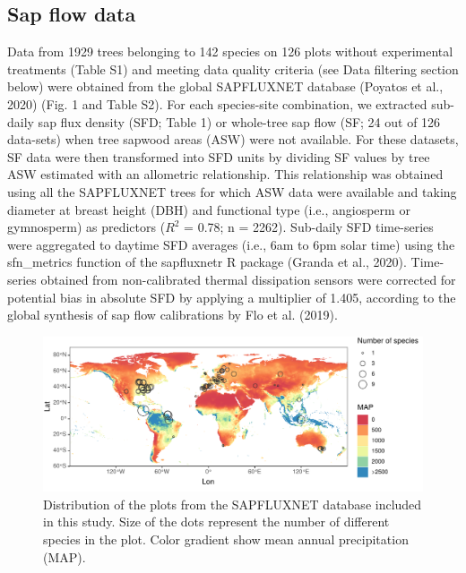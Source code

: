 \documentclass[11pt,twoside]{reedthesis}
\begin{document}
\subsection{Sap flow data}\label{sap-flow-data}

Data from 1929 trees belonging to 142 species on 126 plots without
experimental treatments (Table S1) and meeting data quality criteria
(see Data filtering section below) were obtained from the global
SAPFLUXNET database (Poyatos et al., 2020) (Fig. 1 and Table S2). For
each species-site combination, we extracted sub-daily sap flux density
(SFD; Table 1) or whole-tree sap flow (SF; 24 out of 126 data-sets) when
tree sapwood areas (ASW) were not available. For these datasets, SF data
were then transformed into SFD units by dividing SF values by tree ASW
estimated with an allometric relationship. This relationship was
obtained using all the SAPFLUXNET trees for which ASW data were
available and taking diameter at breast height (DBH) and functional type
(i.e., angiosperm or gymnosperm) as predictors (\(R^2\) = 0.78; n =
2262). Sub-daily SFD time-series were aggregated to daytime SFD averages
(i.e., 6am to 6pm solar time) using the sfn\_metrics function of the
sapfluxnetr R package (Granda et al., 2020). Time-series obtained from
non-calibrated thermal dissipation sensors were corrected for potential
bias in absolute SFD by applying a multiplier of 1.405, according to the
global synthesis of sap flow calibrations by Flo et al. (2019).\par
\begin{figure}[hbt!]

{\centering \includegraphics[width=1\linewidth]{figure/CH5/Figure_1} 

}

\caption[Distribution of the plots from the SAPFLUXNET database included in this study.]{Distribution of the plots from the SAPFLUXNET database included in this study. Size of the dots represent the number of different species in the plot. Color gradient show mean annual precipitation (MAP).}\label{fig:ch5fig1}
\end{figure}
\end{document}
